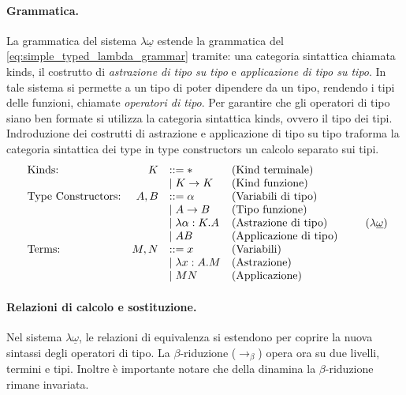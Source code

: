 \paragraph{Grammatica.}
La grammatica del sistema $\lambda\underline{\omega}$ estende la grammatica del \ref{eq:simple_typed_lambda_grammar} tramite: una categoria sintattica chiamata kinds,  
il costrutto di \emph{astrazione di tipo su tipo} e \emph{applicazione di tipo su tipo}. In tale sistema si permette a un tipo di poter dipendere da un tipo, rendendo
i tipi delle funzioni, chiamate \emph{operatori di tipo}. Per garantire che gli operatori di tipo siano ben formate si utilizza la categoria sintattica kinds, ovvero 
il tipo dei tipi. Indroduzione dei costrutti di astrazione e applicazione di tipo su tipo traforma la categoria sintattica dei type in type constructors un calcolo 
separato sui tipi.
\begin{equation}
    \begin{array}{lrll}
        \text{Kinds:}               & K           & ::= \ast                & \text{(Kind terminale)}       \\
                                    &             & \mid K \to K            & \text{(Kind funzione)}        \\
        \text{Type Constructors:}   & A, B        & ::= \alpha              & \text{(Variabili di tipo)}    \\
                                    &             & \mid A \to B            & \text{(Tipo funzione)}        \\
                                    &             & \mid \lambda \alpha:K.A & \text{(Astrazione di tipo)}   \\
                                    &             & \mid A B                & \text{(Applicazione di tipo)} \\
        \text{Terms:}               & M, N        & ::= x                   & \text{(Variabili)}            \\
                                    &             & \mid \lambda x:A. M     & \text{(Astrazione)}           \\
                                    &             & \mid M N                & \text{(Applicazione)}
        \end{array}
    \tag{$\lambda\underline{\omega}$}
    \label{eq:grammar_system_omega_under}
\end{equation}

\paragraph{Relazioni di calcolo e sostituzione.}
Nel sistema $\lambda\underline{\omega}$, le relazioni di equivalenza si estendono per coprire la nuova sintassi degli operatori di tipo. 
La $\beta$-riduzione ($\to_\beta$) opera ora su due livelli, termini e tipi. Inoltre è importante notare che della dinamina la $\beta$-riduzione 
rimane invariata.

